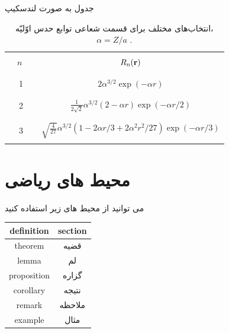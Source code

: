 
جدول به صورت لندسکیپ
 \begin{landscape}
\begin{table}[h]
\begin{center}
\caption{ انتخاب‌های مختلف برای قسمت شعاعی توابع حدس اوّلیّه،$\alpha=Z/a$ \cite{Wannier902013}. \label{tab:radial}}
\begin{latin}
\renewcommand{\arraystretch}{0.6}
\begin{tabular}{|cc|}
\hline\hline
&\\
\ \ $n$ \ \ & $R_{\mathrm{n}}({\bf r})$ \\
&\\\hline&\\
1        &  $2 \alpha^{3/2}\exp(-\alpha r)$ \\
&\\\hline&\\
2        &  $\frac{1}{2\sqrt{2}}\alpha^{3/2}(2-\alpha
r)\exp(-\alpha r/2)$ \\
&\\\hline&\\
3        &  $\sqrt{\frac{4}{27}}\alpha^{3/2}(1-2\alpha r/3+2\alpha^{2}r^{2}/27)\exp(-\alpha r/3)$ \\
&\\\hline\hline
\end{tabular}
\end{latin}
\end{center}
\end{table}
\end{landscape}
 \section{محیط های ریاضی}
 می توانید از محیط های زیر استفاده کنید
 
 \begin{tabular}{|c|c|}
\hline
definition&section\\\hline
theorem & قضیه\\\hline
lemma&لم\\\hline
proposition&گزاره\\\hline
corollary&نتیجه\\\hline
remark&ملاحظه\\\hline
example&مثال\\\hline
\hline
 \end{tabular}
